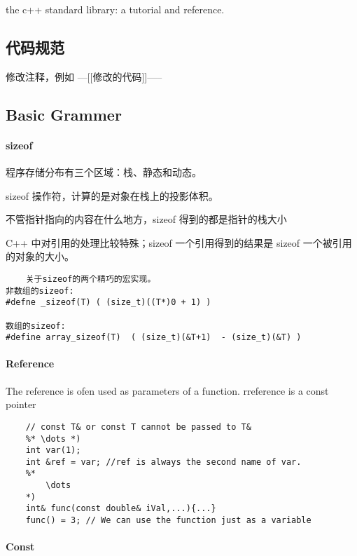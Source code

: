 \documentclass[UTF8]{../computerUniverse}
\begin{document}
the c++ standard library: a tutorial and reference.



\subsection{代码规范}

修改注释，例如
---[[修改的代码]]-----



\subsection{Basic Grammer}

\paragraph{sizeof}

程序存储分布有三个区域：栈、静态和动态。

sizeof 操作符，计算的是对象在栈上的投影体积。

不管指针指向的内容在什么地方，sizeof 得到的都是指针的栈大小

C++ 中对引用的处理比较特殊；sizeof 一个引用得到的结果是 sizeof 一个被引用的对象的大小。



\begin{lstlisting}
    关于sizeof的两个精巧的宏实现。
非数组的sizeof:
#defne _sizeof(T) ( (size_t)((T*)0 + 1) )

数组的sizeof:
#define array_sizeof(T)  ( (size_t)(&T+1)  - (size_t)(&T) )
\end{lstlisting}


\paragraph{Reference}
The reference is ofen used as parameters of a function. 
rreference is a const pointer

\begin{lstlisting}
    // const T& or const T cannot be passed to T&
    %* \dots *)
    int var(1);
    int &ref = var; //ref is always the second name of var.
    %*
        \dots
    *)
    int& func(const double& iVal,...){...}
    func() = 3; // We can use the function just as a variable
\end{lstlisting}

 
\paragraph{Const}
\end{document}
